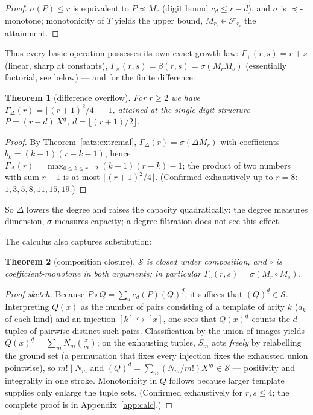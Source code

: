 \documentclass[11pt]{article}
\newtheorem{satz}{Theorem}[section]
\theoremstyle{definition}
\theoremstyle{remark}
\newcommand{\Struk}{\mathcal S}
\newcommand{\ff}[2]{#1^{\underline{#2}}}
\begin{document}
\begin{proof}
$\sigma(P)\le r$ is equivalent to $P\preceq M_r$ (digit bound
$c_d\le r-d$), and $\sigma$ is $\preceq$-monotone; monotonicity of
$T$ yields the upper bound, $M_{r_i}\in\mathcal F_{r_i}$ the
attainment.
\end{proof}

Thus every basic operation possesses its own exact growth law:
$\Gamma_+(r,s)=r+s$ (linear, sharp at constants),
$\Gamma_\times(r,s)=\beta(r,s)=\sigma(M_rM_s)$ (essentially
factorial, see below) --- and for the finite difference:

\begin{satz}[difference overflow]\label{satz:differenzueberlauf}
For $r\ge2$ we have
$\Gamma_\Delta(r)=\lfloor(r+1)^2/4\rfloor-1$, attained at the
single-digit structure $P=(r{-}d)\,\ff Xd$, $d=\lfloor(r+1)/2\rfloor$.
\end{satz}

\begin{proof}
By Theorem~\ref{satz:extremal},
$\Gamma_\Delta(r)=\sigma(\Delta M_r)$ with coefficients
$b_k=(k{+}1)(r{-}k{-}1)$, hence
$\Gamma_\Delta(r)=\max_{0\le k\le r-2}(k{+}1)(r{-}k)-1$; the
product of two numbers with sum $r{+}1$ is at most
$\lfloor(r{+}1)^2/4\rfloor$. (Confirmed exhaustively up to $r=8$:
$1,3,5,8,11,15,19$.)
\end{proof}

So $\Delta$ lowers the degree and raises the capacity
quadratically: the degree measures dimension, $\sigma$ measures
capacity; a degree filtration does not see this effect.

The calculus also captures substitution:

\begin{satz}[composition closure]\label{satz:komposition}
$\Struk$ is closed under composition, and $\circ$ is
coefficient-monotone in both arguments; in particular
$\Gamma_\circ(r,s)=\sigma(M_r\circ M_s)$.
\end{satz}

\begin{proof}[Proof sketch]
Because $P\circ Q=\sum_d c_d(P)(Q)^{\underline d}$, it suffices
that $(Q)^{\underline d}\in\Struk$. Interpreting $Q(x)$ as the
number of pairs consisting of a template of arity $k$ ($a_k$ of
each kind) and an injection $[k]\hookrightarrow[x]$, one sees that
$Q(x)^{\underline d}$ counts the $d$-tuples of pairwise distinct
such pairs. Classification by the union of images yields
$Q(x)^{\underline d}=\sum_m N_m\binom xm$; on the exhausting
tuples, $S_m$ acts \emph{freely} by relabelling the ground set (a
permutation that fixes every injection fixes the exhausted union
pointwise), so $m!\mid N_m$ and
$(Q)^{\underline d}=\sum_m(N_m/m!)X^{\underline m}\in\Struk$ ---
positivity and integrality in one stroke. Monotonicity in $Q$
follows because larger template supplies only enlarge the tuple
sets.
(Confirmed exhaustively for $r,s\le4$; the complete proof is in
Appendix~\ref{app:calc}.)
\end{proof}
\end{document}
